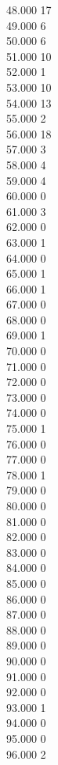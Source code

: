 { 48.000	17 \\
 49.000	6 \\
 50.000	6 \\
 51.000	10 \\
 52.000	1 \\
 53.000	10 \\
 54.000	13 \\
 55.000	2 \\
 56.000	18 \\
 57.000	3 \\
 58.000	4 \\
 59.000	4 \\
 60.000	0 \\
 61.000	3 \\
 62.000	0 \\
 63.000	1 \\
 64.000	0 \\
 65.000	1 \\
 66.000	1 \\
 67.000	0 \\
 68.000	0 \\
 69.000	1 \\
 70.000	0 \\
 71.000	0 \\
 72.000	0 \\
 73.000	0 \\
 74.000	0 \\
 75.000	1 \\
 76.000	0 \\
 77.000	0 \\
 78.000	1 \\
 79.000	0 \\
 80.000	0 \\
 81.000	0 \\
 82.000	0 \\
 83.000	0 \\
 84.000	0 \\
 85.000	0 \\
 86.000	0 \\
 87.000	0 \\
 88.000	0 \\
 89.000	0 \\
 90.000	0 \\
 91.000	0 \\
 92.000	0 \\
 93.000	1 \\
 94.000	0 \\
 95.000	0 \\
 96.000	2 \\
}
